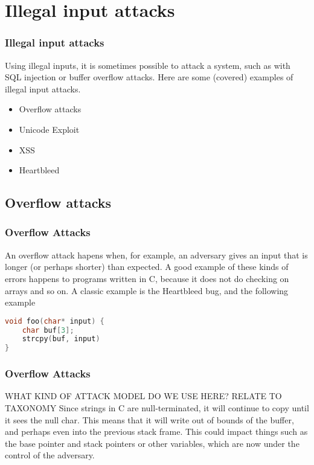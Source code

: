 \section{Illegal input attacks}
    \begin{frame}
        \frametitle{Illegal input attacks} 
            Using illegal inputs, it is sometimes possible to attack a system, such as with SQL injection or buffer overflow attacks. Here are some (covered) examples of illegal input attacks. 
            \begin{itemize}
                \item Overflow attacks
                \item Unicode Exploit
                \item XSS
                \item Heartbleed
            \end{itemize}
    \end{frame}

\subsection{Overflow attacks}
\begin{frame}[fragile]
    \frametitle{Overflow Attacks}
        An overflow attack hapens when, for example, an adversary gives an input that is longer (or perhaps shorter) than expected. A good example of these kinds of errors happens to programs written in C, because it does not do checking on arrays and so on. A classic example is the Heartbleed bug, and the following example
        \begin{lstlisting}[language=C, frame=single]
void foo(char* input) {
    char buf[3];
    strcpy(buf, input)
}
        \end{lstlisting}

\end{frame}
    \begin{frame}
        \frametitle{Overflow Attacks}
                WHAT KIND OF ATTACK MODEL DO WE USE HERE? RELATE TO TAXONOMY
            Since strings in C are null-terminated, it will continue to copy until it sees the null char. This means that it will write out of bounds of the buffer, and perhaps even into the previous stack frame. This could impact things such as the base pointer and stack pointers or other variables, which are now under the control of the adversary.
    \end{frame}

